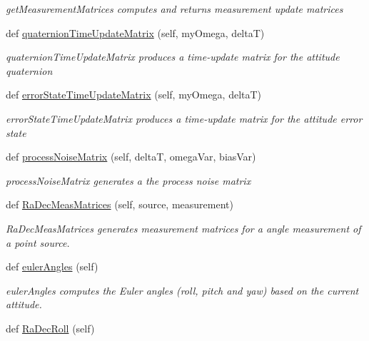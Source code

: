 \begin{DoxyCompactItemize}
\begin{DoxyCompactList}\small\item\em get\+Measurement\+Matrices computes and returns measurement update matrices \end{DoxyCompactList}\item 
def \hyperlink{classAttitudeSubstate_1_1AttitudeState6DOF_aada43a81dfe3ae7b1a22dd24220062e8}{quaternion\+Time\+Update\+Matrix} (self, my\+Omega, deltaT)
\begin{DoxyCompactList}\small\item\em quaternion\+Time\+Update\+Matrix produces a time-\/update matrix for the attitude quaternion \end{DoxyCompactList}\item 
def \hyperlink{classAttitudeSubstate_1_1AttitudeState6DOF_a98463a04f2b7f78389d7cce944139afd}{error\+State\+Time\+Update\+Matrix} (self, my\+Omega, deltaT)
\begin{DoxyCompactList}\small\item\em error\+State\+Time\+Update\+Matrix produces a time-\/update matrix for the attitude error state \end{DoxyCompactList}\item 
def \hyperlink{classAttitudeSubstate_1_1AttitudeState6DOF_abc5b2c8345bcd948d35b438fce184dee}{process\+Noise\+Matrix} (self, deltaT, omega\+Var, bias\+Var)
\begin{DoxyCompactList}\small\item\em process\+Noise\+Matrix generates a the process noise matrix \end{DoxyCompactList}\item 
def \hyperlink{classAttitudeSubstate_1_1AttitudeState6DOF_a3292931688716329fb80cbeac83f7ee7}{Ra\+Dec\+Meas\+Matrices} (self, source, measurement)
\begin{DoxyCompactList}\small\item\em Ra\+Dec\+Meas\+Matrices generates measurement matrices for a angle measurement of a point source. \end{DoxyCompactList}\item 
def \hyperlink{classAttitudeSubstate_1_1AttitudeState6DOF_a34f52f0e701e78ba8e92bff57f56110d}{euler\+Angles} (self)
\begin{DoxyCompactList}\small\item\em euler\+Angles computes the Euler angles (roll, pitch and yaw) based on the current attitude. \end{DoxyCompactList}\item 
def \hyperlink{classAttitudeSubstate_1_1AttitudeState6DOF_a4728d7547aee8612fdd5e2875a37f8a2}{Ra\+Dec\+Roll} (self)

\end{DoxyCompactItemize}
